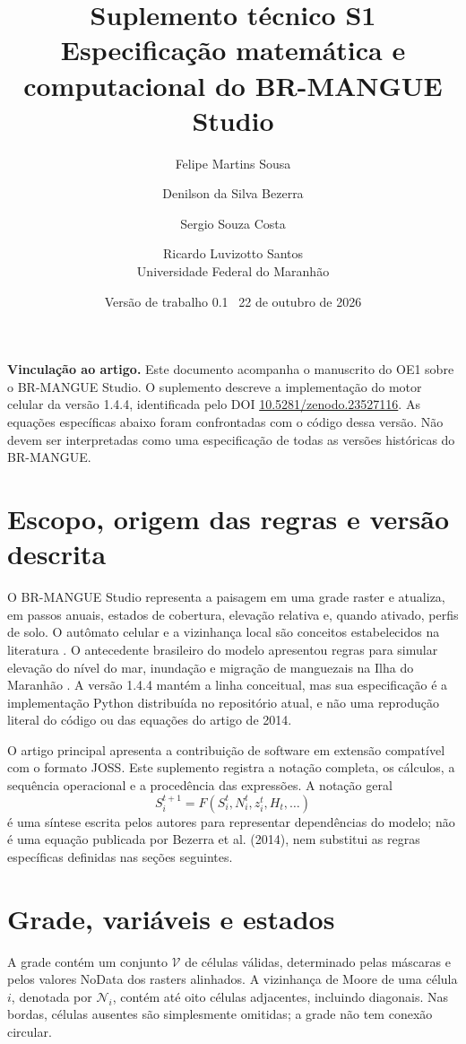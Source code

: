 \documentclass[11pt,a4paper]{article}
\title{\textbf{Suplemento técnico S1}\\[4pt]
Especificação matemática e computacional do BR-MANGUE Studio}
\author{Felipe Martins Sousa \and Denilson da Silva Bezerra \and Sergio Souza Costa \and Ricardo Luvizotto Santos\\
\small Universidade Federal do Maranhão}
\date{Versão de trabalho 0.1 \textbar\ 22 de outubro de 2026}
\begin{document}
\maketitle

\noindent\textbf{Vinculação ao artigo.} Este documento acompanha o manuscrito do OE1 sobre o BR-MANGUE Studio. O suplemento descreve a implementação do motor celular da versão 1.4.4, identificada pelo DOI \href{https://doi.org/10.5281/zenodo.23527116}{10.5281/zenodo.23527116}. As equações específicas abaixo foram confrontadas com o código dessa versão. Não devem ser interpretadas como uma especificação de todas as versões históricas do BR-MANGUE.

\section{Escopo, origem das regras e versão descrita}

O BR-MANGUE Studio representa a paisagem em uma grade raster e atualiza, em passos anuais, estados de cobertura, elevação relativa e, quando ativado, perfis de solo. O autômato celular e a vizinhança local são conceitos estabelecidos na literatura \citep{wolfram1983,osullivan2001}. O antecedente brasileiro do modelo apresentou regras para simular elevação do nível do mar, inundação e migração de manguezais na Ilha do Maranhão \citep{bezerra2014}. A versão 1.4.4 mantém a linha conceitual, mas sua especificação é a implementação Python distribuída no repositório atual, e não uma reprodução literal do código ou das equações do artigo de 2014.

O artigo principal apresenta a contribuição de software em extensão compatível com o formato JOSS. Este suplemento registra a notação completa, os cálculos, a sequência operacional e a procedência das expressões. A notação geral
\[
S_i^{t+1}=F(S_i^t,N_i^t,z_i^t,H_t,\ldots)
\]
é uma síntese escrita pelos autores para representar dependências do modelo; não é uma equação publicada por Bezerra et al. (2014), nem substitui as regras específicas definidas nas seções seguintes.

\section{Grade, variáveis e estados}

A grade contém um conjunto $\mathcal{V}$ de células válidas, determinado pelas máscaras e pelos valores NoData dos rasters alinhados. A vizinhança de Moore de uma célula $i$, denotada por $\mathcal{N}_i$, contém até oito células adjacentes, incluindo diagonais. Nas bordas, células ausentes são simplesmente omitidas; a grade não tem conexão circular.
\end{document}
